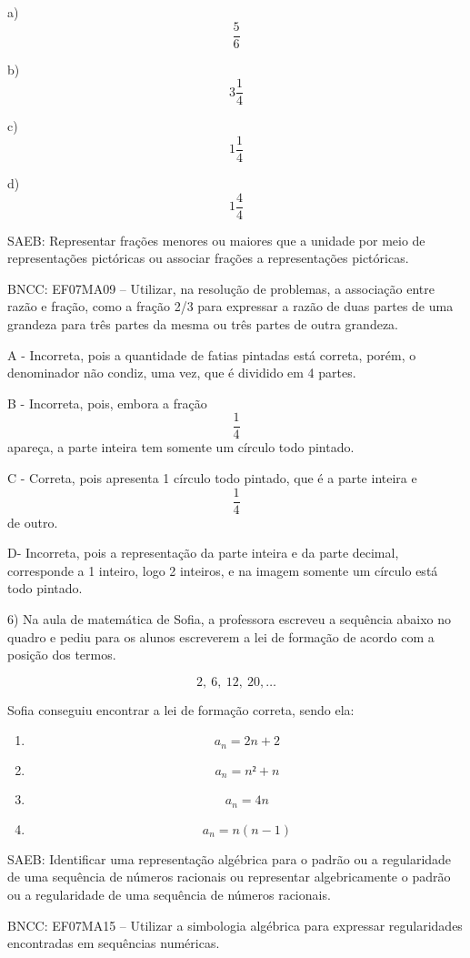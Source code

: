 a) \[\frac{5}{6}\]

b) \[3\frac{1}{4}\]

c) \[1\frac{1}{4}\]

d) \[1\frac{4}{4}\]

SAEB: Representar frações menores ou maiores que a unidade por meio de
representações pictóricas ou associar frações a representações
pictóricas.

BNCC: EF07MA09 -- Utilizar, na resolução de problemas, a associação
entre razão e fração, como a fração 2/3 para expressar a razão de duas
partes de uma grandeza para três partes da mesma ou três partes de outra
grandeza.

A - Incorreta, pois a quantidade de fatias pintadas está correta, porém,
o denominador não condiz, uma vez, que é dividido em 4 partes.

B - Incorreta, pois, embora a fração \[\frac{1}{4}\] apareça, a parte
inteira tem somente um círculo todo pintado.

C - Correta, pois apresenta 1 círculo todo pintado, que é a parte
inteira e \[\frac{1}{4}\] de outro.

D- Incorreta, pois a representação da parte inteira e da parte decimal,
corresponde a 1 inteiro, logo 2 inteiros, e na imagem somente um círculo
está todo pintado.

6) Na aula de matemática de Sofia, a professora escreveu a sequência
abaixo no quadro e pediu para os alunos escreverem a lei de formação de
acordo com a posição dos termos.

\[2,\ 6,\ 12,\ 20,\ldots\]

Sofia conseguiu encontrar a lei de formação correta, sendo ela:

\begin{enumerate}
\def\labelenumi{\alph{enumi})}
\item
  \[a_{n} = 2n + 2\]
\item
  \[a_{n} = n² + n\]
\item
  \[a_{n} = 4n\]
\item
  \[a_{n} = n(n - 1)\]
\end{enumerate}

SAEB: Identificar uma representação algébrica para o padrão ou a
regularidade de uma sequência de números racionais ou representar
algebricamente o padrão ou a regularidade de uma sequência de números
racionais.

BNCC: EF07MA15 -- Utilizar a simbologia algébrica para expressar
regularidades encontradas em sequências numéricas.


